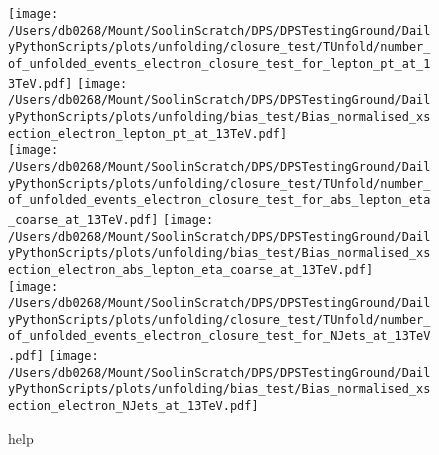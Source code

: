 \begin{figure*}[htpb]
	\centering
	\texttt{[image: /Users/db0268/Mount/SoolinScratch/DPS/DPSTestingGround/DailyPythonScripts/plots/unfolding/closure\_test/TUnfold/number\_of\_unfolded\_events\_electron\_closure\_test\_for\_lepton\_pt\_at\_13TeV.pdf]}
	\texttt{[image: /Users/db0268/Mount/SoolinScratch/DPS/DPSTestingGround/DailyPythonScripts/plots/unfolding/bias\_test/Bias\_normalised\_xsection\_electron\_lepton\_pt\_at\_13TeV.pdf]} \\
	\texttt{[image: /Users/db0268/Mount/SoolinScratch/DPS/DPSTestingGround/DailyPythonScripts/plots/unfolding/closure\_test/TUnfold/number\_of\_unfolded\_events\_electron\_closure\_test\_for\_abs\_lepton\_eta\_coarse\_at\_13TeV.pdf]}
	\texttt{[image: /Users/db0268/Mount/SoolinScratch/DPS/DPSTestingGround/DailyPythonScripts/plots/unfolding/bias\_test/Bias\_normalised\_xsection\_electron\_abs\_lepton\_eta\_coarse\_at\_13TeV.pdf]} \\
	\texttt{[image: /Users/db0268/Mount/SoolinScratch/DPS/DPSTestingGround/DailyPythonScripts/plots/unfolding/closure\_test/TUnfold/number\_of\_unfolded\_events\_electron\_closure\_test\_for\_NJets\_at\_13TeV.pdf]}
	\texttt{[image: /Users/db0268/Mount/SoolinScratch/DPS/DPSTestingGround/DailyPythonScripts/plots/unfolding/bias\_test/Bias\_normalised\_xsection\_electron\_NJets\_at\_13TeV.pdf]} \\
	\caption[help]{help}
	\label{fig:ClosureBiase2}
\end{figure*}

